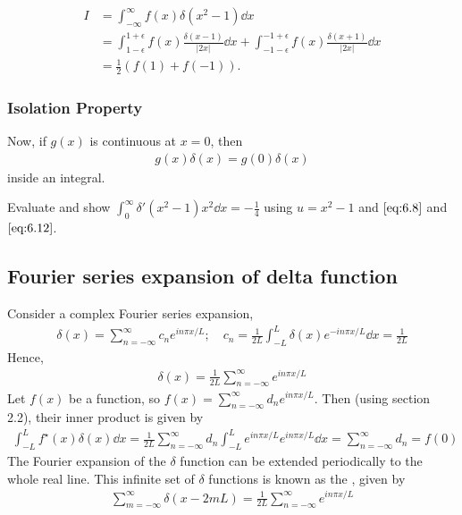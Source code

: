 \begin{example}
	\begin{align*}
		I &= \int_{-\infty}^{\infty} f(x) \delta(x^2 - 1) \dd{x} \\
		&= \int_{1 - \epsilon}^{1 + \epsilon} f(x) \frac{\delta(x - 1)}{|2x|} \dd{x} + \int_{-1 - \epsilon}^{-1 + \epsilon} f(x) \frac{\delta(x + 1)}{|2x|} \dd{x} \\
		&= \frac{1}{2} (f(1) + f(-1)).
	\end{align*} 
\end{example} 

\subsubsection{Isolation Property}
Now, if $g(x)$ is continuous at $x = 0$, then 
\begin{align}
	g(x) \delta(x) = g(0) \delta(x) \label{eq:6.13}
\end{align} 
inside an integral.

\begin{exercise}
	Evaluate and show $\int_{0}^{\infty} \delta'(x^2 - 1) x^2 \dd{x} = - \frac{1}{4}$ using $u = x^2 - 1$ and $\cref{eq:6.8}$ and $\cref{eq:6.12}$.
\end{exercise} 

\subsection{Fourier series expansion of delta function}
Consider a complex Fourier series expansion,
\begin{align*}
	\delta(x) = \sum_{n=-\infty}^\infty c_n e^{in\pi x/L};\quad c_n = \frac{1}{2L}\int_{-L}^L \delta(x) e^{-i n \pi x / L} \dd{x} = \frac{1}{2L}
\end{align*}
Hence,
\begin{align} \label{eq:6.14}
	\delta(x) = \frac{1}{2L} \sum_{n=-\infty}^\infty e^{in\pi x/L}
\end{align}
Let $f(x)$ be a function, so $f(x) = \sum_{n=-\infty}^\infty d_n e^{in \pi x / L}$.
Then (using section 2.2), their inner product is given by
\begin{align*}
	\int_{-L}^L f^\star(x) \delta(x) \dd{x} = \frac{1}{2L} \sum_{n = -\infty}^\infty d_n \int_{-L}^L e^{in \pi x/L} e^{in \pi x/L} \dd{x} = \sum_{n = -\infty}^\infty d_n = f(0)
\end{align*}
The Fourier expansion of the $\delta$ function can be extended periodically to the whole real line.
This infinite set of $\delta$ functions is known as the , given by
\begin{align*}
	\sum_{m = -\infty}^\infty \delta(x-2mL) = \frac{1}{2L} \sum_{n = -\infty}^\infty e^{in \pi x/L}
\end{align*}


